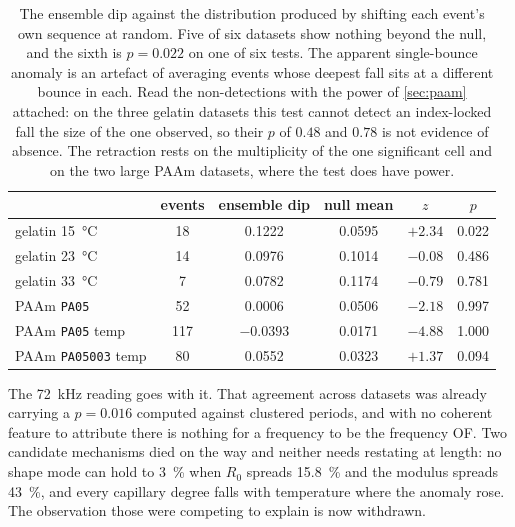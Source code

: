 \documentclass[10pt]{article}
\begin{document}
\begin{table}[htbp]
\centering
\caption{The ensemble dip against the distribution produced by shifting each event's own
sequence at random. Five of six datasets show nothing beyond the null, and the sixth is
$p = 0.022$ on one of six tests. The apparent single-bounce anomaly is an artefact of averaging
events whose deepest fall sits at a different bounce in each. Read the non-detections with the
power of \cref{sec:paam} attached: on the three gelatin datasets this test cannot detect an
index-locked fall the size of the one observed, so their $p$ of $0.48$ and $0.78$ is not
evidence of absence. The retraction rests on the multiplicity of the one significant cell and on
the two large PAAm datasets, where the test does have power.}
\label{tab:afterbounce}
\begin{tabular}{lccccc}
\toprule
& events & ensemble dip & null mean & $z$ & $p$ \\
\midrule
gelatin \SI{15}{\celsius} & 18 & 0.1222 & 0.0595 & $+2.34$ & 0.022 \\
gelatin \SI{23}{\celsius} & 14 & 0.0976 & 0.1014 & $-0.08$ & 0.486 \\
gelatin \SI{33}{\celsius} & 7 & 0.0782 & 0.1174 & $-0.79$ & 0.781 \\
PAAm \texttt{PA05} & 52 & 0.0006 & 0.0506 & $-2.18$ & 0.997 \\
PAAm \texttt{PA05} temp & 117 & $-0.0393$ & 0.0171 & $-4.88$ & 1.000 \\
PAAm \texttt{PA05003} temp & 80 & 0.0552 & 0.0323 & $+1.37$ & 0.094 \\
\bottomrule
\end{tabular}
\end{table}

The \SI{72}{\kilo\hertz} reading goes with it. That agreement across datasets was already
carrying a $p = 0.016$ computed against clustered periods, and with no coherent feature to
attribute there is nothing for a frequency to be the frequency OF. Two candidate mechanisms
died on the way and neither needs restating at length: no shape mode can hold to
\SI{3}{\percent} when $R_0$ spreads \SI{15.8}{\percent} and the modulus spreads
\SI{43}{\percent}, and every capillary degree falls with temperature where the anomaly rose.
The observation those were competing to explain is now withdrawn.
\end{document}
